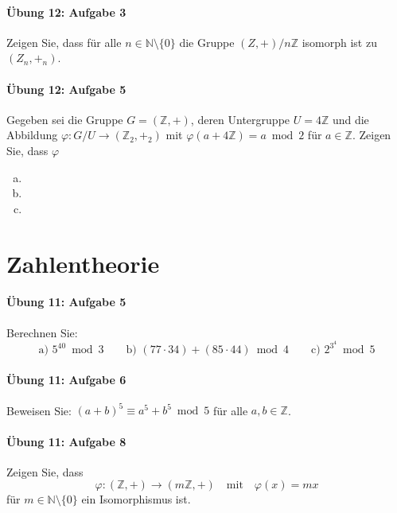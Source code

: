 \documentclass
[
  draft    = true,
  fontsize = 11pt,
  parskip  = half-,
  BCOR     = 0pt,
  DIV      = 11,
  ngerman,
  dvipsnames
]
{scrartcl}
\begin{document}
\paragraph{Übung 12: Aufgabe 3}
Zeigen Sie, dass für alle $n\in\mathbb{N}\setminus\{0\}$ die Gruppe
$(Z,+)/n\mathbb{Z}$ isomorph ist zu $(Z_n, +_n)$.

\paragraph{Übung 12: Aufgabe 5}
Gegeben sei die Gruppe $G=(\mathbb{Z},+)$, deren Untergruppe $U=4\mathbb{Z}$
und die Abbildung $\varphi:G/U\rightarrow(\mathbb{Z}_2 ,+_2)$ mit
$\varphi(a+4\mathbb{Z})=a\bmod2$ für $a\in\mathbb{Z}$. Zeigen Sie, dass
$\varphi$
\begin{enumerate}[a)]
  \item
  \item
  \item
\end{enumerate}

\section{Zahlentheorie}

\paragraph{Übung 11: Aufgabe 5}
Berechnen Sie:
\begin{equation*}
  \text{a) }5^{40}\bmod3
  \qquad
  \text{b) }(77\cdot34)+(85\cdot44)\bmod4
  \qquad
  \text{c) }2^{3^4}\bmod5
\end{equation*}

\paragraph{Übung 11: Aufgabe 6}
Beweisen Sie: $(a+b)^5\equiv a^5+b^5\bmod5$ für alle $a,b\in\mathbb{Z}$.

\paragraph{Übung 11: Aufgabe 8}
Zeigen Sie, dass
\begin{equation*}
  \varphi:(\mathbb{Z},+)\rightarrow(m\mathbb{Z},+)\quad\text{mit}\quad\varphi(x)=mx
\end{equation*}
für $m\in\mathbb{N}\setminus\{0\}$ ein Isomorphismus ist.
\end{document}
